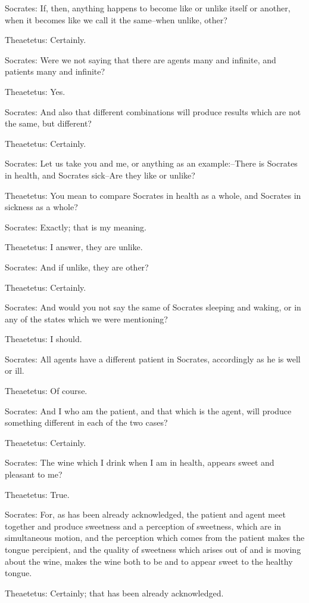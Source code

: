 Socrates: If, then, anything happens to become like or unlike itself or
another, when it becomes like we call it the same--when unlike, other?

Theaetetus: Certainly.

Socrates: Were we not saying that there are agents many and infinite,
and patients many and infinite?

Theaetetus: Yes.

Socrates: And also that different combinations will produce results
which are not the same, but different?

Theaetetus: Certainly.

Socrates: Let us take you and me, or anything as an example:--There is
Socrates in health, and Socrates sick--Are they like or unlike?

Theaetetus: You mean to compare Socrates in health as a whole, and
Socrates in sickness as a whole?

Socrates: Exactly; that is my meaning.

Theaetetus: I answer, they are unlike.

Socrates: And if unlike, they are other?

Theaetetus: Certainly.

Socrates: And would you not say the same of Socrates sleeping and
waking, or in any of the states which we were mentioning?

Theaetetus: I should.

Socrates: All agents have a different patient in Socrates, accordingly
as he is well or ill.

Theaetetus: Of course.

Socrates: And I who am the patient, and that which is the agent, will
produce something different in each of the two cases?

Theaetetus: Certainly.

Socrates: The wine which I drink when I am in health, appears sweet and
pleasant to me?

Theaetetus: True.

Socrates: For, as has been already acknowledged, the patient and agent
meet together and produce sweetness and a perception of sweetness, which
are in simultaneous motion, and the perception which comes from the
patient makes the tongue percipient, and the quality of sweetness which
arises out of and is moving about the wine, makes the wine both to be
and to appear sweet to the healthy tongue.

Theaetetus: Certainly; that has been already acknowledged.

